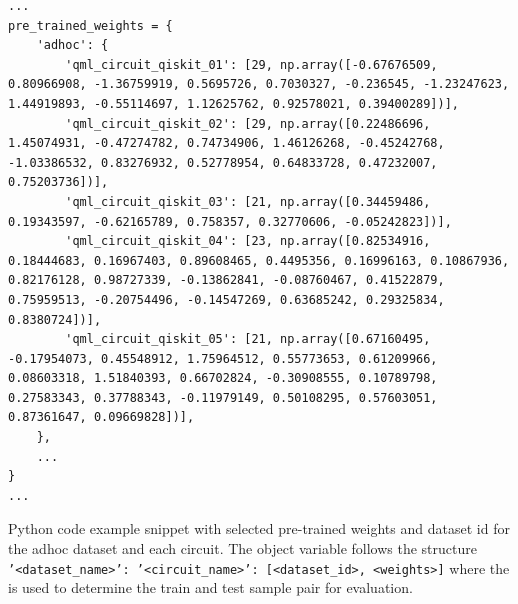 \begin{listing}[!ht]
    \begin{verbatim}
...
pre_trained_weights = {
    'adhoc': {
        'qml_circuit_qiskit_01': [29, np.array([-0.67676509, 0.80966908, -1.36759919, 0.5695726, 0.7030327, -0.236545, -1.23247623, 1.44919893, -0.55114697, 1.12625762, 0.92578021, 0.39400289])],
        'qml_circuit_qiskit_02': [29, np.array([0.22486696, 1.45074931, -0.47274782, 0.74734906, 1.46126268, -0.45242768, -1.03386532, 0.83276932, 0.52778954, 0.64833728, 0.47232007, 0.75203736])],
        'qml_circuit_qiskit_03': [21, np.array([0.34459486, 0.19343597, -0.62165789, 0.758357, 0.32770606, -0.05242823])],
        'qml_circuit_qiskit_04': [23, np.array([0.82534916, 0.18444683, 0.16967403, 0.89608465, 0.4495356, 0.16996163, 0.10867936, 0.82176128, 0.98727339, -0.13862841, -0.08760467, 0.41522879, 0.75959513, -0.20754496, -0.14547269, 0.63685242, 0.29325834, 0.8380724])],
        'qml_circuit_qiskit_05': [21, np.array([0.67160495, -0.17954073, 0.45548912, 1.75964512, 0.55773653, 0.61209966, 0.08603318, 1.51840393, 0.66702824, -0.30908555, 0.10789798, 0.27583343, 0.37788343, -0.11979149, 0.50108295, 0.57603051, 0.87361647, 0.09669828])], 
    },
    ...
}
...
    \end{verbatim}
    \caption{Python code example snippet with selected pre-trained weights and dataset id for the adhoc dataset and each circuit. The object variable  follows the structure \texttt{{'<dataset_name>':{ '<circuit_name>': [<dataset_id>, <weights>]}}} where the  is used to determine the train and test sample pair for evaluation.}
    \label{listing:pre-trained_weights_evaluation_run_adhoc}
\end{listing}


